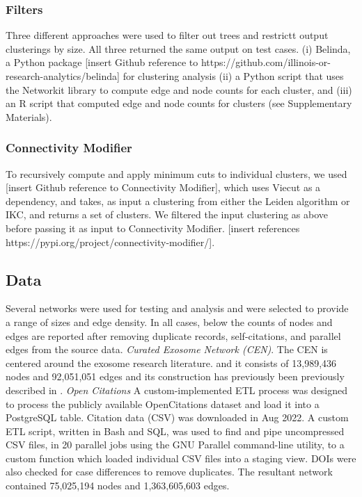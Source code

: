 \documentclass[12pt, oneside]{article}   	%
\begin{document}
\subsubsection{Filters} Three different approaches were used to filter out trees and restrictt output clusterings by size. All three returned the same output on test cases. (i) Belinda, a Python package [insert Github reference to https://github.com/illinois-or-research-analytics/belinda] for clustering analysis (ii) a Python script that uses the Networkit library \citep{Staudt2016} to compute edge and node counts for each cluster, and (iii) an R script that computed edge and node counts for clusters (see Supplementary Materials). 

\subsubsection{Connectivity Modifier} To recursively compute and apply minimum cuts to individual clusters, we used [insert Github reference to Connectivity Modifier], which uses Viecut \cite{Henzinger2018,Henzinger2019} as a dependency, and takes, as input a clustering from either the Leiden algorithm or IKC, and returns a set of clusters. We filtered the input clustering as above before passing it as input to Connectivity Modifier. [insert references https://pypi.org/project/connectivity-modifier/].

\subsection{Data} Several networks were used for testing and analysis and were selected to provide a range of sizes and edge density. In all cases, below the counts of nodes and edges are reported after removing duplicate records, 
self-citations, and parallel edges from the source data. \emph{Curated Exosome Network (CEN)}. The CEN is centered around the exosome research literature. and it consists of 13,989,436 nodes and 92,051,051 edges and its construction has previously been previously described in \citep{Jakatdar_2022}.  \emph{Open Citations} A custom-implemented ETL process was designed to process the publicly available OpenCitations dataset \citep{Peroni2020} and load it into a PostgreSQL table. Citation data (CSV) was downloaded in Aug 2022. A custom ETL script, written in Bash and SQL, was used to find and pipe uncompressed CSV files, in 20 parallel jobs using the GNU Parallel command-line utility, to a custom function which loaded individual CSV files into a staging view. DOIs were also checked for case differences to remove duplicates.  The resultant network contained 75,025,194 nodes and 1,363,605,603 edges.  
\end{document}
